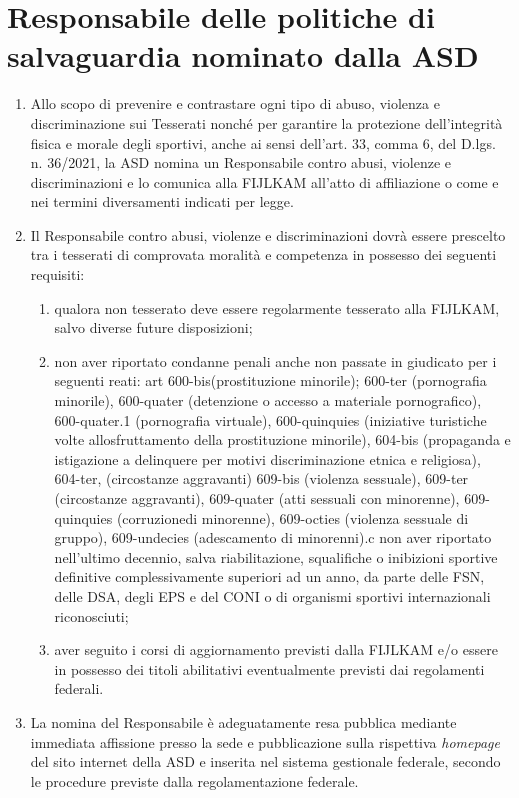 \documentclass{djtsdoc}
\begin{document}
	\section{Responsabile delle politiche di salvaguardia nominato dalla ASD}
	\begin{enumerate}
		\item Allo scopo di prevenire e contrastare ogni tipo di abuso, violenza e discriminazione sui Tesserati nonché per garantire la protezione dell'integrità fisica e morale degli sportivi, anche ai sensi dell'art. 33, comma 6, del D.lgs. n. 36/2021, la ASD nomina un Responsabile contro abusi, violenze e discriminazioni e lo comunica alla FIJLKAM all'atto di affiliazione o come e nei termini diversamenti indicati per legge.
		\item Il Responsabile contro abusi, violenze e discriminazioni dovrà essere prescelto tra i tesserati di comprovata moralità e competenza in possesso dei seguenti requisiti:
		\begin{enumerate}
			\item qualora non tesserato deve essere regolarmente tesserato alla FIJLKAM, salvo diverse future disposizioni;
			\item non aver riportato condanne penali anche non passate in giudicato per i seguenti reati: art 600-bis(prostituzione minorile); 600-ter (pornografia minorile), 600-quater (detenzione o accesso a materiale pornografico), 600-quater.1 (pornografia virtuale), 600-quinquies (iniziative turistiche volte allosfruttamento della prostituzione minorile), 604-bis (propaganda e istigazione a delinquere per motivi discriminazione etnica e religiosa), 604-ter, (circostanze aggravanti) 609-bis (violenza sessuale), 609-ter (circostanze aggravanti), 609-quater (atti sessuali con minorenne), 609-quinquies (corruzionedi minorenne), 609-octies (violenza sessuale di gruppo), 609-undecies (adescamento di minorenni).c non aver riportato nell'ultimo decennio, salva riabilitazione, squalifiche o inibizioni sportive definitive complessivamente superiori ad un anno, da parte delle FSN, delle DSA, degli EPS e del CONI o di organismi sportivi internazionali riconosciuti;
			\item aver seguito i corsi di aggiornamento previsti dalla FIJLKAM e/o essere in possesso dei titoli abilitativi eventualmente previsti dai regolamenti federali.
		\end{enumerate}
		\item La nomina del Responsabile è adeguatamente resa pubblica mediante immediata affissione presso la sede e pubblicazione sulla rispettiva \textit{homepage} del sito internet della ASD e inserita nel sistema gestionale federale, secondo le procedure previste dalla regolamentazione federale.

\end{enumerate}
\end{document}
